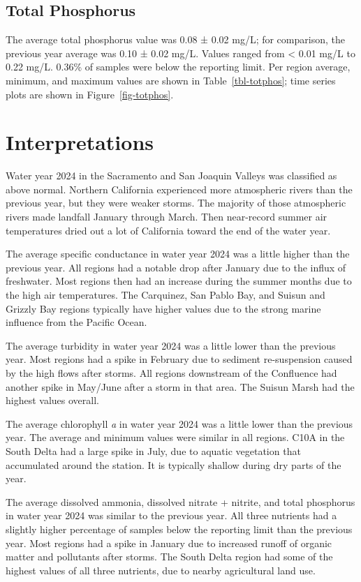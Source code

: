 \documentclass[
  letterpaper,
]{article}
\begin{document}
\subsection{Total Phosphorus}\label{total-phosphorus}

The average total phosphorus value was 0.08 ± 0.02 mg/L; for comparison,
the previous year average was 0.10 ± 0.02 mg/L. Values ranged from
\textless{} 0.01 mg/L to 0.22 mg/L. 0.36\% of samples were below the
reporting limit. Per region average, minimum, and maximum values are
shown in Table~\ref{tbl-totphos}; time series plots are shown in
Figure~\ref{fig-totphos}.

\section{Interpretations}\label{interpretations}

Water year 2024 in the Sacramento and San Joaquin Valleys was classified
as above normal. Northern California experienced more atmospheric rivers
than the previous year, but they were weaker storms. The majority of
those atmospheric rivers made landfall January through March. Then
near-record summer air temperatures dried out a lot of California toward
the end of the water year.

The average specific conductance in water year 2024 was a little higher
than the previous year. All regions had a notable drop after January due
to the influx of freshwater. Most regions then had an increase during
the summer months due to the high air temperatures. The Carquinez, San
Pablo Bay, and Suisun and Grizzly Bay regions typically have higher
values due to the strong marine influence from the Pacific Ocean.

The average turbidity in water year 2024 was a little lower than the
previous year. Most regions had a spike in February due to sediment
re-suspension caused by the high flows after storms. All regions
downstream of the Confluence had another spike in May/June after a storm
in that area. The Suisun Marsh had the highest values overall.

The average chlorophyll \emph{a} in water year 2024 was a little lower
than the previous year. The average and minimum values were similar in
all regions. C10A in the South Delta had a large spike in July, due to
aquatic vegetation that accumulated around the station. It is typically
shallow during dry parts of the year.

The average dissolved ammonia, dissolved nitrate + nitrite, and total
phosphorus in water year 2024 was similar to the previous year. All
three nutrients had a slightly higher percentage of samples below the
reporting limit than the previous year. Most regions had a spike in
January due to increased runoff of organic matter and pollutants after
storms. The South Delta region had some of the highest values of all
three nutrients, due to nearby agricultural land use.
\end{document}
